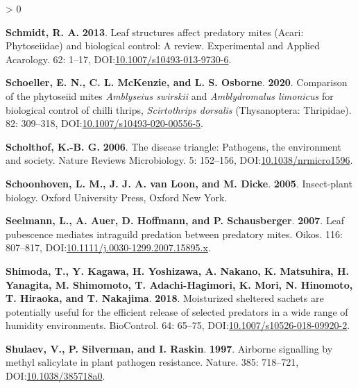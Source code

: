 \documentclass{ufdissertation}[overrideChapters] %
\newlength{\cslhangindent}
\newenvironment{CSLReferences}[2] %
 {%
  \setlength{\parindent}{0pt}
  \ifodd #1 \everypar{\setlength{\hangindent}{\cslhangindent}}\ignorespaces\fi
  \ifnum #2 > 0
  \setlength{\parskip}{#2\baselineskip}
  \fi
 }%
 {}
\begin{document}
{\begin{CSLReferences}{1}{1}
\leavevmode{}%
\textbf{Schmidt, R. A.} \textbf{2013}. Leaf structures affect predatory mites ({Acari}: {Phytoseiidae}) and biological control: A review. Experimental and Applied Acarology. 62: 1--17, DOI:\href{https://doi.org/10.1007/s10493-013-9730-6}{10.1007/s10493-013-9730-6}.

\leavevmode{}%
\textbf{Schoeller, E. N., C. L. McKenzie, and L. S. Osborne}. \textbf{2020}. Comparison of the phytoseiid mites {\emph{Amblyseius swirskii}} and {\emph{Amblydromalus limonicus}} for biological control of chilli thrips, {\emph{Scirtothrips dorsalis}} ({Thysanoptera}: {Thripidae}). 82: 309--318, DOI:\href{https://doi.org/10.1007/s10493-020-00556-5}{10.1007/s10493-020-00556-5}.

\leavevmode{}%
\textbf{Scholthof, K.-B. G.} \textbf{2006}. The disease triangle: Pathogens, the environment and society. Nature Reviews Microbiology. 5: 152--156, DOI:\href{https://doi.org/10.1038/nrmicro1596}{10.1038/nrmicro1596}.

\leavevmode{}%
\textbf{Schoonhoven, L. M., J. J. A. van Loon, and M. Dicke}. \textbf{2005}. Insect-plant biology. Oxford University Press, Oxford New York.

\leavevmode{}%
\textbf{Seelmann, L., A. Auer, D. Hoffmann, and P. Schausberger}. \textbf{2007}. Leaf pubescence mediates intraguild predation between predatory mites. Oikos. 116: 807--817, DOI:\href{https://doi.org/10.1111/j.0030-1299.2007.15895.x}{10.1111/j.0030-1299.2007.15895.x}.

\leavevmode{}%
\textbf{Shimoda, T., Y. Kagawa, H. Yoshizawa, A. Nakano, K. Matsuhira, H. Yanagita, M. Shimomoto, T. Adachi-Hagimori, K. Mori, N. Hinomoto, T. Hiraoka, and T. Nakajima}. \textbf{2018}. Moisturized sheltered sachets are potentially useful for the efficient release of selected predators in a wide range of humidity environments. {BioControl}. 64: 65--75, DOI:\href{https://doi.org/10.1007/s10526-018-09920-2}{10.1007/s10526-018-09920-2}.

\leavevmode{}%
\textbf{Shulaev, V., P. Silverman, and I. Raskin}. \textbf{1997}. Airborne signalling by methyl salicylate in plant pathogen resistance. Nature. 385: 718--721, DOI:\href{https://doi.org/10.1038/385718a0}{10.1038/385718a0}.


\end{CSLReferences}}
\end{document}
